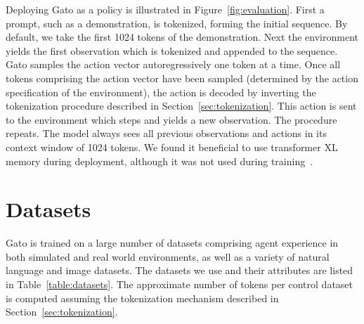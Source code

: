 \documentclass[10pt]{article} \usepackage[accepted]{tmlr}
\newcommand{\model}{{Gato}}
\begin{document}
Deploying \model{} as a policy is illustrated in Figure~\ref{fig:evaluation}.
First a prompt, such as a demonstration, is tokenized, forming the initial sequence.
By default, we take the first 1024 tokens of the demonstration.
Next the environment yields the first observation which is tokenized and appended to the sequence.
\model{} samples the action vector autoregressively one token at a time.
Once all tokens comprising the action vector have been sampled (determined by the action specification of the environment), the action is decoded by inverting the tokenization procedure described in Section~\ref{sec:tokenization}.
This action is sent to the environment which steps and yields a new observation.
The procedure repeats.
The model always sees all previous observations and actions in its context window of 1024 tokens.
We found it beneficial to use transformer XL memory during deployment, although it was not used during training~\citep{dai2019transformer}.


\section{Datasets}
\label{sec:datasets}


\model{} is trained on a large number of datasets comprising agent experience in both simulated and real world environments, as well as a variety of natural language and image datasets.
The datasets we use and their attributes are listed in Table~\ref{table:datasets}.
The approximate number of tokens per control dataset is computed assuming the tokenization mechanism described in Section~\ref{sec:tokenization}.
\end{document}
